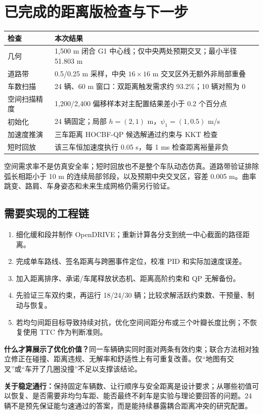 \documentclass[UTF8,fontset=fandol,11pt,a4paper]{ctexart}
\newcommand{\page}[1]{\clearpage\section{#1}}
\begin{document}
\page{已完成的距离版检查与下一步}
\begin{center}\small
\begin{tabular}{P{4cm}P{9.3cm}}\toprule
检查 & 本次结果\\\midrule
几何 & 1,500 m 闭合 G1 中心线；仅中央两处预期交叉；最小半径 51.803 m\\
道路带 & 0.5/0.25 m 采样，中央 $16\times16$ m 交叉区外无额外非局部重叠\\
车数扫描 & 24 辆、60 m 窗口：双距离触发需求约 93.2\%；10 辆对照为 0\\
空间扫描精度 & 1,200/2,400 偏移样本对主配置结果差小于 0.2 个百分点\\
初始化 & 24 辆固定；局部 $h=(2,1)$ m，$\psi_1=(1,0.5)$ m/s\\
加速度推演 & 三车距离 HOCBF-QP 候选解通过约束与 KKT 检查\\
短时回放 & 该三车恒加速度执行 0.05 s，每 1 ms 检查距离裕量非负\\\bottomrule
\end{tabular}\end{center}
空间需求率不是仿真安全率；短时回放也不是整个车队动态仿真。道路带验证排除弧长相距小于 10 m 的连续局部邻段，以及预期中央交叉区，容差 0.005 m。曲率跳变、路肩、车身姿态和未来生成网格仍需另行验证。

\subsection{需要实现的工程链}
\begin{enumerate}
\item 细化缓和段并制作 OpenDRIVE；重新计算各分支到统一中心截面的路径距离。
\item 完成单车路线、签名距离与跨圈事件定位，校准 PID 和实际加速度误差。
\item 加入距离排序、承诺/车尾释放状态机、距离高阶约束和 QP 无解备份。
\item 先验证三车双约束，再运行 18/24/30 辆；比较求解活跃约束数、干预量、制动与恢复。
\item 若均匀间距目标导致持续对抗，优化空间间距分布或三个叶瓣长度比例；不恢复使用 TTC 作为判断准则。
\end{enumerate}

\textbf{什么才算展示了优化价值？}同一车辆确实同时面对两条有效约束；联合方法相对独立修正在碰撞、距离违规、无解率和舒适性上有可重复改善。仅“地图有交叉”或“车开了几圈没撞”不足以支撑该结论。

\textbf{关于稳定通行：}保持固定车辆数、让行顺序与安全距离是设计要求；从哪些初值可以恢复、是否需要非均匀车距、能否最终不刹车是实验与理论要回答的问题。24 辆不是预先保证能匀速通过的答案，而是能持续暴露耦合距离冲突的研究配置。
\end{document}
